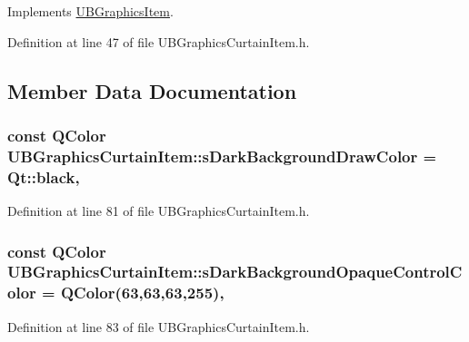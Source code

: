 Implements \hyperlink{class_u_b_graphics_item_acab0781401cac08c9ad99b0cd0fa8480}{U\-B\-Graphics\-Item}.



Definition at line 47 of file U\-B\-Graphics\-Curtain\-Item.\-h.



\subsection{Member Data Documentation}
\hypertarget{class_u_b_graphics_curtain_item_a5260196daa4e1d00427797c585aeaaac}{
\subsubsection[{s\-Dark\-Background\-Draw\-Color}]{\setlength{\rightskip}{0pt plus 5cm}const Q\-Color U\-B\-Graphics\-Curtain\-Item\-::s\-Dark\-Background\-Draw\-Color = Qt\-::black\hspace{0.3cm}{\ttfamily [static]}, {\ttfamily [protected]}}}\label{d5/d13/class_u_b_graphics_curtain_item_a5260196daa4e1d00427797c585aeaaac}


Definition at line 81 of file U\-B\-Graphics\-Curtain\-Item.\-h.

\hypertarget{class_u_b_graphics_curtain_item_a0364030708ad1c7aaee23912349f4681}{
\subsubsection[{s\-Dark\-Background\-Opaque\-Control\-Color}]{\setlength{\rightskip}{0pt plus 5cm}const Q\-Color U\-B\-Graphics\-Curtain\-Item\-::s\-Dark\-Background\-Opaque\-Control\-Color = Q\-Color(63,63,63,255)\hspace{0.3cm}{\ttfamily [static]}, {\ttfamily [protected]}}}\label{d5/d13/class_u_b_graphics_curtain_item_a0364030708ad1c7aaee23912349f4681}


Definition at line 83 of file U\-B\-Graphics\-Curtain\-Item.\-h.

